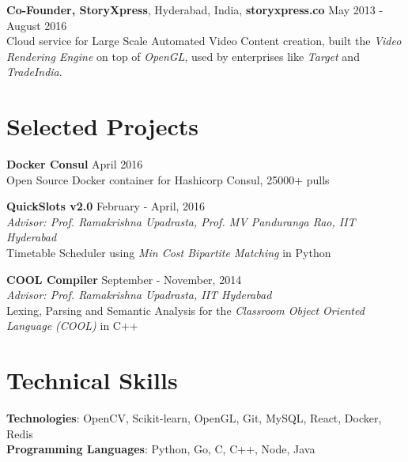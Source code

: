 \documentclass[margin,line]{res}
\begin{document}
\begin{resume}
  \vspace*{-3.5mm}

  {\bf Co-Founder, StoryXpress}, Hyderabad, India, \textbf{storyxpress.co}  \hfill May 2013 - August 2016 \\
    Cloud service for Large Scale Automated Video Content creation, built the {\it Video Rendering Engine} on top of {\it OpenGL}, used by enterprises like {\it Target} and {\it TradeIndia}.

  \vspace*{-3.5mm}

\section{\sc Selected Projects}

  {\bf Docker Consul} \hfill April 2016 \\
  	Open Source Docker container for Hashicorp Consul, 25000+ pulls

  \vspace*{-3.5mm}

  {\bf QuickSlots v2.0} \hfill February - April, 2016 \\
  	{\it Advisor: Prof. Ramakrishna Upadrasta, Prof. MV Panduranga Rao, IIT Hyderabad} \vspace{0.15 \baselineskip} \\
    Timetable Scheduler using {\em Min Cost Bipartite Matching} in Python

  \vspace*{-3.5mm}

  {\bf COOL Compiler} \hfill September - November, 2014 \\
  	{\it Advisor: Prof. Ramakrishna Upadrasta, IIT Hyderabad} \vspace{0.15 \baselineskip} \\
    Lexing, Parsing and Semantic Analysis for the {\it Classroom Object Oriented Language (COOL)} in C++

  \vspace*{-3.5mm}

\section{\sc Technical Skills}

  {\bf Technologies}: OpenCV, Scikit-learn, OpenGL, Git, MySQL, React, Docker, Redis \\
  {\bf Programming Languages}: Python, Go, C, C++, Node, Java

\begin{comment}

\end{comment}
\end{resume}
\end{document}
